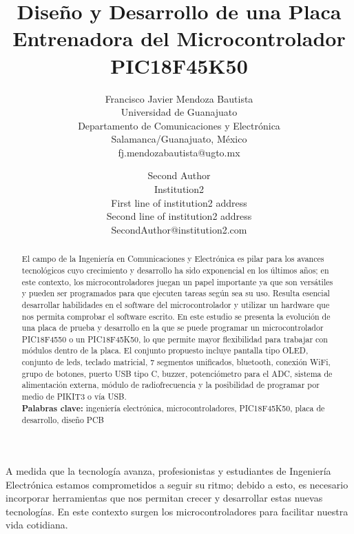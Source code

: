 \documentclass[times, 10pt,twocolumn]{article}
\begin{document}
\title{Diseño y Desarrollo de una Placa Entrenadora del Microcontrolador PIC18F45K50}
\author{Francisco Javier Mendoza Bautista\\
Universidad de Guanajuato\\ Departamento de Comunicaciones y Electrónica \\  
Salamanca/Guanajuato, México\\fj.mendozabautista@ugto.mx\\
\and
Second Author\\
Institution2\\
First line of institution2 address\\ Second line of institution2 address\\ 
SecondAuthor@institution2.com\\
}

\maketitle
\thispagestyle{empty}

\begin{abstract} 
El campo de la Ingeniería en Comunicaciones y Electrónica es pilar para los avances tecnológicos cuyo crecimiento y desarrollo ha sido exponencial en los últimos años; en este contexto, los microcontroladores juegan un papel importante ya que son versátiles y pueden ser programados para que ejecuten tareas según sea su uso. Resulta esencial desarrollar habilidades en el software del microcontrolador y utilizar un hardware que nos permita comprobar el software escrito. En este estudio se presenta la evolución de una placa de prueba y desarrollo en la que se puede programar un microcontrolador PIC18F4550 o un PIC18F45K50, lo que permite mayor flexibilidad para trabajar con módulos dentro de la placa. El conjunto propuesto incluye pantalla tipo OLED, conjunto de leds, teclado matricial, 7 segmentos unificados, bluetooth, conexión WiFi, grupo de botones, puerto USB tipo C, buzzer, potenciómetro para el ADC, sistema de alimentación externa, módulo de radiofrecuencia y la posibilidad de programar por medio de PIKIT3 o vía USB.\\

\textbf{Palabras clave:} ingeniería electrónica, microcontroladores, PIC18F45K50, placa de desarrollo, diseño PCB
\end{abstract}
\vspace*{-0.6cm}
\vspace*{-0.1cm}
A medida que la tecnología avanza, profesionistas y estudiantes de Ingeniería Electrónica estamos comprometidos a seguir su ritmo; debido a esto, es necesario incorporar herramientas que nos permitan crecer y desarrollar estas nuevas tecnologías. En este contexto surgen los microcontroladores para facilitar nuestra vida cotidiana.
\end{document}
